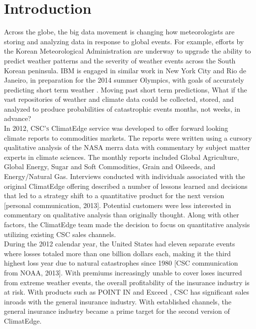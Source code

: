 \section{Introduction}
Across the globe, the big data movement is changing how meteorologists are storing and analyzing data in response to global events. For example, efforts by the Korean Meteorological Administration are underway to upgrade the ability to predict weather patterns and the severity of weather events across the South Korean peninsula. IBM is engaged in similar work in New York City and Rio de Janeiro, in preparation for the 2014 summer Olympics, with goals of accurately predicting short term weather \cite{rwe}. Moving past short term predictions, What if the vast repositories of weather and climate data could be collected, stored, and analyzed to produce probabilities of catastrophic events months, not weeks, in advance?\\

In 2012, \textsc{CSC's} ClimatEdge\texttrademark{} service was developed to offer forward looking climate reports to commodities markets. The reports were written using a cursory qualitative analysis of the NASA \gls{merra} data with commentary by subject matter experts in climate sciences. The monthly reports included Global Agriculture, Global Energy, Sugar and Soft Commodities, Grain and Oilseeds, and Energy/Natural Gas\cite{climatedgeurl}. Interviews conducted with individuals associated with the original ClimatEdge offering described a number of lessons learned and decisions that led to a strategy shift to a quantitative product for the next version [personal communication, 2013]. Potential customers were less interested in commentary on qualitative analysis than originally thought. Along with other factors, the ClimatEdge team made the decision to focus on quantitative analysis utilizing existing CSC sales channels.\\

During the 2012 calendar year, the United States had eleven separate events where losses totaled more than one billion dollars each, making it the third highest loss year due to natural catastrophes since 1980 [\textsc{CSC} communication from NOAA, 2013]. With premiums increasingly unable to cover loses incurred from extreme weather events, the overall profitability of the insurance industry is at risk. With products such as POINT IN \cite{point_in} and Exceed \cite{exceed}, \textsc{CSC} has significant sales inroads with the general insurance industry. With established channels, the general insurance industry became a prime target for the second version of ClimatEdge.\\

